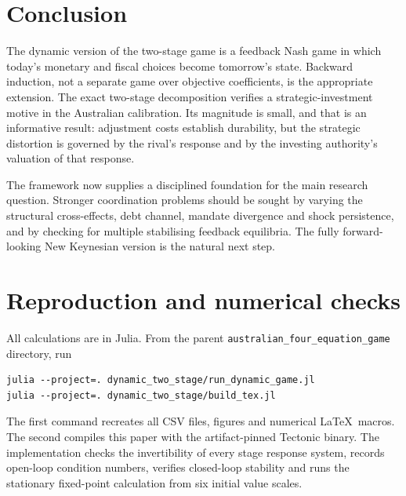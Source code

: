 \documentclass[11pt]{article}
\begin{document}
\section{Conclusion}

The dynamic version of the two-stage game is a feedback Nash game in which
today's monetary and fiscal choices become tomorrow's state.  Backward
induction, not a separate game over objective coefficients, is the appropriate
extension.  The exact two-stage decomposition verifies a strategic-investment
motive in the Australian calibration.  Its magnitude is small, and that is an
informative result: adjustment costs establish durability, but the strategic
distortion is governed by the rival's response and by the investing authority's
valuation of that response.

The framework now supplies a disciplined foundation for the main research
question.  Stronger coordination problems should be sought by varying the
structural cross-effects, debt channel, mandate divergence and shock
persistence, and by checking for multiple stabilising feedback equilibria.
The fully forward-looking New Keynesian version is the natural next step.

\appendix
\section{Reproduction and numerical checks}

All calculations are in Julia.  From the parent
\texttt{australian\_four\_equation\_game} directory, run
\begin{verbatim}
julia --project=. dynamic_two_stage/run_dynamic_game.jl
julia --project=. dynamic_two_stage/build_tex.jl
\end{verbatim}
The first command recreates all CSV files, figures and numerical \LaTeX\
macros.  The second compiles this paper with the artifact-pinned Tectonic
binary.  The implementation checks the invertibility of every stage response
system, records open-loop condition numbers, verifies closed-loop stability and
runs the stationary fixed-point calculation from six initial value scales.
\end{document}
